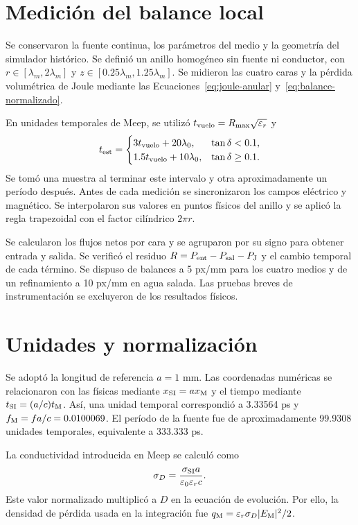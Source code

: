 \section{Medición del balance local}
Se conservaron la fuente continua, los parámetros del medio y la geometría del simulador histórico. Se definió un anillo homogéneo sin fuente ni conductor, con $r\in[\lambda_m,2\lambda_m]$ y $z\in[0.25\lambda_m,1.25\lambda_m]$. Se midieron las cuatro caras y la pérdida volumétrica de Joule mediante las Ecuaciones~\ref{eq:joule-anular} y~\ref{eq:balance-normalizado}.

En unidades temporales de Meep, se utilizó $t_{\rm vuelo}=R_{\max}\sqrt{\varepsilon_r}$ y
\begin{equation}
 t_{\rm est}=\begin{cases}3t_{\rm vuelo}+20\lambda_0,&\tan\delta<0.1,\\1.5t_{\rm vuelo}+10\lambda_0,&\tan\delta\geq0.1.\end{cases}
\end{equation}
Se tomó una muestra al terminar este intervalo y otra aproximadamente un período después. Antes de cada medición se sincronizaron los campos eléctrico y magnético. Se interpolaron sus valores en puntos físicos del anillo y se aplicó la regla trapezoidal con el factor cilíndrico $2\pi r$.

Se calcularon los flujos netos por cara y se agruparon por su signo para obtener entrada y salida. Se verificó el residuo $R=P_{\rm ent}-P_{\rm sal}-P_{\rm J}$ y el cambio temporal de cada término. Se dispuso de balances a 5 px/mm para los cuatro medios y de un refinamiento a 10 px/mm en agua salada. Las pruebas breves de instrumentación se excluyeron de los resultados físicos.

\section{Unidades y normalización}\label{sec:unidades-campana}
Se adoptó la longitud de referencia $a=1$ mm. Las coordenadas numéricas se relacionaron con las físicas mediante $x_{\rm SI}=a x_{\rm M}$ y el tiempo mediante $t_{\rm SI}=(a/c)t_{\rm M}$. Así, una unidad temporal correspondió a 3.33564 ps y $f_{\rm M}=fa/c=0.0100069$. El período de la fuente fue de aproximadamente 99.9308 unidades temporales, equivalente a 333.333 ps.

La conductividad introducida en Meep se calculó como
\begin{equation}
 \sigma_D=\frac{\sigma_{\rm SI}a}{\varepsilon_0\varepsilon_r c}.
\end{equation}
Este valor normalizado multiplicó a $D$ en la ecuación de evolución. Por ello, la densidad de pérdida usada en la integración fue $q_{\rm M}=\varepsilon_r\sigma_D|E_{\rm M}|^2/2$.

